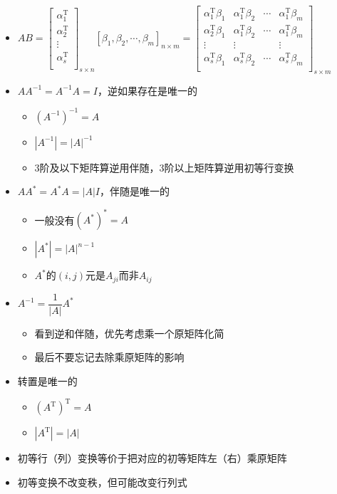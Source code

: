 \documentclass[lang=cn,newtx,10pt,scheme=chinese]{elegantbook}
\begin{document}
\begin{itemize}
	\item $AB = 
        \left[
        \begin{matrix}
            \alpha_1^\mathrm{T} \\
            \alpha_2^\mathrm{T} \\
            \vdots \\
            \alpha_s^\mathrm{T} \\
        \end{matrix}
        \right]_{s \times n}
        [\beta_1,\beta_2,\cdots,\beta_m]_{n \times m}
        =
        \left[
        \begin{matrix}
            \alpha_1^\mathrm{T} \beta_1 & \alpha_1^\mathrm{T} \beta_2 & \cdots & \alpha_1^\mathrm{T} \beta_m \\
            \alpha_2^\mathrm{T} \beta_1 & \alpha_1^\mathrm{T} \beta_2 & \cdots & \alpha_1^\mathrm{T} \beta_m \\
            \vdots & \vdots & & \vdots \\
            \alpha_s^\mathrm{T} \beta_1 & \alpha_s^\mathrm{T} \beta_2 & \cdots & \alpha_s^\mathrm{T} \beta_m \\
        \end{matrix}
        \right]_{s \times m}
        $
	\item $A A^{-1} = A^{-1} A = I$，逆如果存在是唯一的
	\begin{itemize}
        \item $(A^{-1})^{-1} = A$
        \item $\left|A^{-1}\right| =  \left|A\right|^{-1}$
        \item 3阶及以下矩阵算逆用伴随，3阶以上矩阵算逆用初等行变换
    \end{itemize}
	\item $A A^* = A^* A = \left|A\right| I$，伴随是唯一的
	\begin{itemize}
        \item 一般没有$(A^*)^{*} = A$
        \item $\left|A^*\right| = \left|A\right|^{n-1}$
        \item $A^*$的$(i,j)$元是$A_{ji}$而非$A_{ij}$
    \end{itemize}
    \item $A^{-1} = \dfrac{1}{\left|A\right|} A^*$
    \begin{itemize}
        \item 看到逆和伴随，优先考虑乘一个原矩阵化简
        \item 最后不要忘记去除乘原矩阵的影响
    \end{itemize}
    \item 转置是唯一的
    \begin{itemize}
        \item $(A^\mathrm{T})^\mathrm{T} = A$
        \item $\left|A^\mathrm{T}\right| = \left|A\right|$
    \end{itemize}
    \item 初等行（列）变换等价于把对应的初等矩阵左（右）乘原矩阵
    \item 初等变换不改变秩，但可能改变行列式
\end{itemize}
\end{document}
